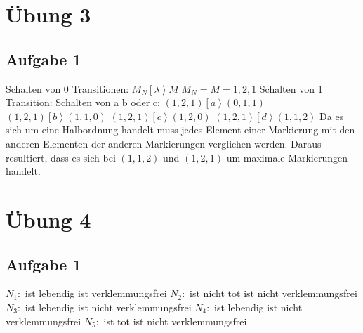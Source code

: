 \documentclass[12pt]{scrreprt}
\begin{document}
\newpage

\section{Übung 3}
\subsection*{Aufgabe 1}
Schalten von 0 Transitionen:\newline
$M_N \left[\lambda\right> M$ \tabto{4cm} $M_N = M = {1,2,1}$\newline
Schalten von 1 Transition:\newline
Schalten von a b oder c:\newline
${(1,2,1)} \left[a\right> {(0,1,1)}$\newline
${(1,2,1)} \left[b\right> {(1,1,0)}$\newline
${(1,2,1)} \left[c\right> {(1,2,0)}$\newline
${(1,2,1)} \left[d\right> {(1,1,2)}$\newline
Da es sich um eine Halbordnung handelt muss jedes Element einer Markierung mit den anderen Elementen der anderen Markierungen verglichen werden. Daraus resultiert, dass es sich bei $(1,1,2)$ und $(1,2,1)$ um maximale Markierungen handelt.

\section{Übung 4}
\subsection*{Aufgabe 1}
$N_1:$	\tabto{2cm} ist lebendig\newline
		\tabto{2cm} ist verklemmungsfrei\newline
$N_2:$	\tabto{2cm} ist nicht tot\newline
		\tabto{2cm} ist nicht verklemmungsfrei\newline
$N_3:$	\tabto{2cm} ist lebendig\newline
		\tabto{2cm} ist nicht verklemmungsfrei\newline
$N_4:$	\tabto{2cm} ist lebendig\newline
		\tabto{2cm} ist nicht verklemmungsfrei\newline
$N_5:$	\tabto{2cm} ist tot\newline
		\tabto{2cm} ist nicht verklemmungsfrei\newline
\end{document}
